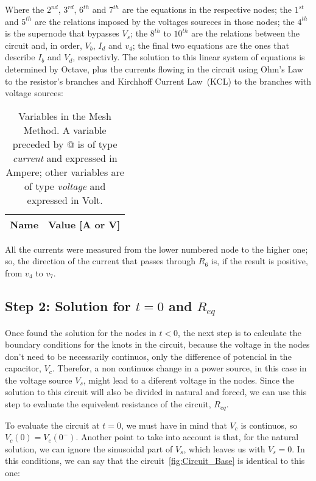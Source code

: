 Where the $2^{nd}$, $3^{rd}$, $6^{th}$ and $7^{th}$ are the equations in the respective nodes; the $1^{st}$ and $5^{th}$ are the relations imposed by the voltages soureces in those nodes; the $4^{th}$ is the supernode that bypasses $V_s$; the $8^{th}$ to $10^{th}$ are the relations between the circuit and, in order, $V_b$, $I_d$ and $v_4$; the final two equations are the ones that describe $I_b$ and $V_d$, respectivly. 
The solution to this linear system of equations is determined by Octave, plus the currents flowing in the circuit using Ohm's Law to the resistor's branches and Kirchhoff Current Law~(KCL) to the branches with voltage sources:

\begin{table}[h]
  \centering
  \begin{tabular}{|l|r|}
    \hline    
    {\bf Name} & {\bf Value [A or V]} \\ \hline
    
  \end{tabular}
  \caption{Variables in the Mesh Method. A variable preceded by @ is of type {\em current} and expressed in Ampere; other variables are of type {\em voltage} and expressed in Volt.}
  \label{tab:PASSO1}
\end{table}

All the currents were measured from the lower numbered node to the higher one; so, the direction of the current that passes through $R_6$ is, if the result is positive, from $v_4$ to $v_7$.

\subsection{Step 2: Solution for $t=0$ and $R_{eq}$}

Once found the solution for the nodes in $t<0$, the next step is to calculate the boundary conditions for the knots in the circuit, because the voltage in the nodes don't need to be necessarily continuos, only the difference of potencial in the capacitor, $V_c$. Therefor, a non continuos change in a power source, in this case in the voltage source $V_s$, might lead to a diferent voltage in the nodes.
Since the solution to this circuit will also be divided in natural and forced, we can use this step to evaluate the equivelent resistance of the circuit, $R_{eq}$.

To evaluate the circuit at $t=0$, we must have in mind that $V_c$ is continuos, so $V_c(0)=V_c(0^-)$. Another point to take into account is that, for the natural solution, we can ignore the sinusoidal part of $V_s$, which leaves us with $V_s=0$. In this conditions, we can say that the circuit~\ref{fig:Circuit_Base} is identical to this one:

